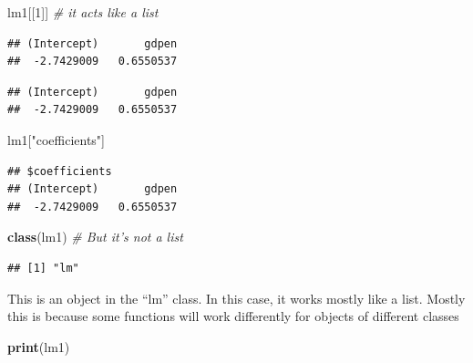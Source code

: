 \documentclass[]{article}
\newenvironment{Shaded}{\begin{snugshade}}{\end{snugshade}}
\newcommand{\KeywordTok}[1]{\textcolor[rgb]{0.13,0.29,0.53}{\textbf{#1}}}
\newcommand{\DecValTok}[1]{\textcolor[rgb]{0.00,0.00,0.81}{#1}}
\newcommand{\StringTok}[1]{\textcolor[rgb]{0.31,0.60,0.02}{#1}}
\newcommand{\CommentTok}[1]{\textcolor[rgb]{0.56,0.35,0.01}{\textit{#1}}}
\newcommand{\OperatorTok}[1]{\textcolor[rgb]{0.81,0.36,0.00}{\textbf{#1}}}
\newcommand{\NormalTok}[1]{#1}
\begin{document}
\begin{Shaded}
\begin{Highlighting}[]
\NormalTok{lm1[[}\DecValTok{1}\NormalTok{]] }\CommentTok{# it acts like a list}
\end{Highlighting}
\end{Shaded}

\begin{verbatim}
## (Intercept)       gdpen 
##  -2.7429009   0.6550537
\end{verbatim}

\begin{Shaded}
\end{Shaded}

\begin{verbatim}
## (Intercept)       gdpen 
##  -2.7429009   0.6550537
\end{verbatim}

\begin{Shaded}
\begin{Highlighting}[]
\NormalTok{lm1[}\StringTok{"coefficients"}\NormalTok{]}
\end{Highlighting}
\end{Shaded}

\begin{verbatim}
## $coefficients
## (Intercept)       gdpen 
##  -2.7429009   0.6550537
\end{verbatim}

\begin{Shaded}
\begin{Highlighting}[]
\KeywordTok{class}\NormalTok{(lm1) }\CommentTok{# But it's not a list}
\end{Highlighting}
\end{Shaded}

\begin{verbatim}
## [1] "lm"
\end{verbatim}

This is an object in the ``lm'' class. In this case, it works mostly
like a list. Mostly this is because some functions will work differently
for objects of different classes

\begin{Shaded}
\begin{Highlighting}[]
\KeywordTok{print}\NormalTok{(lm1)}
\end{Highlighting}
\end{Shaded}
\end{document}
